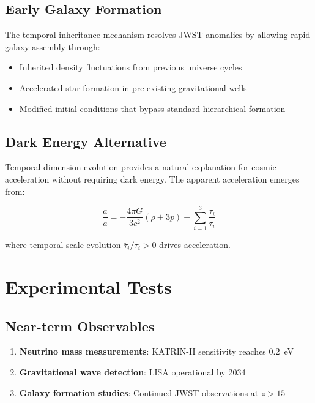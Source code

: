 \documentclass[reprint,amsmath,amssymb,aps,prd,nofootinbib]{revtex4-2}
\begin{document}
\subsection{Early Galaxy Formation}

The temporal inheritance mechanism resolves JWST anomalies by allowing rapid galaxy assembly through:

\begin{itemize}
\item Inherited density fluctuations from previous universe cycles
\item Accelerated star formation in pre-existing gravitational wells
\item Modified initial conditions that bypass standard hierarchical formation
\end{itemize}

\subsection{Dark Energy Alternative}

Temporal dimension evolution provides a natural explanation for cosmic acceleration without requiring dark energy. The apparent acceleration emerges from:

\begin{equation}
\frac{\ddot{a}}{a} = -\frac{4\pi G}{3c^2}(\rho + 3p) + \sum_{i=1}^{3}\frac{\ddot{\tau_i}}{\tau_i}
\label{eq:temporal_acceleration}
\end{equation}

where temporal scale evolution $\ddot{\tau_i}/\tau_i > 0$ drives acceleration.

\section{Experimental Tests}\label{sec:tests}

\subsection{Near-term Observables}

\begin{enumerate}
\item \textbf{Neutrino mass measurements}: KATRIN-II sensitivity reaches \SI{0.2}{\electronvolt}
\item \textbf{Gravitational wave detection}: LISA operational by 2034
\item \textbf{Galaxy formation studies}: Continued JWST observations at $z > 15$
\end{enumerate}
\end{document}
